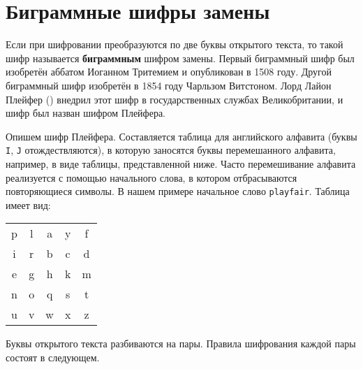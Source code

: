 \section{Биграммные шифры замены}

Если при шифровании преобразуются по две буквы открытого текста, то такой шифр называется \textbf{биграммным} шифром замены. Первый биграммный шифр был изобретён аббатом Иоганном Тритемием и опубликован в 1508 году. Другой биграммный шифр изобретён в 1854 году Чарльзом Витстоном. Лорд Лайон Плейфер () внедрил этот шифр в государственных службах Великобритании, и шифр был назван шифром Плейфера.

Опишем шифр Плейфера. Составляется таблица для английского алфавита (буквы \texttt{I}, \texttt{J} отождествляются), в которую заносятся буквы перемешанного алфавита, например, в виде таблицы, представленной ниже. Часто перемешивание алфавита реализуется с помощью начального слова, в котором отбрасываются повторяющиеся символы. В нашем примере начальное слово \texttt{playfair}. Таблица имеет вид:

\begin{center}
    \begin{tabular}{ccccc}
        p & l & a & y & f  \\
        i & r & b & c & d  \\
        e & g & h & k & m  \\
        n & o & q & s & t  \\
        u & v & w & x & z  \\
    \end{tabular}
\end{center}

Буквы открытого текста разбиваются на пары. Правила шифрования каждой пары состоят в следующем.

